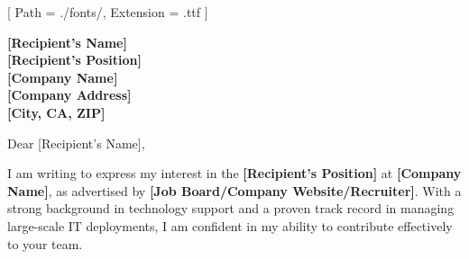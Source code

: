 

\newcommand{\RecipientName}{[Recipient's Name]}
\newcommand{\RecipientPosition}{[Recipient's Position]}
\newcommand{\CompanyName}{[Company Name]}
\newcommand{\CompanyAddress}{[Company Address]}
\newcommand{\CompanyCityStateZIP}{[City, CA, ZIP]}
\newcommand{\JobSource}{[Job Board/Company Website/Recruiter]}
\newcommand{\SpecificReason}{[Specific reason related to the company or position]}

\ifincludephoto
\else
  \renewcommand{\photo}[2]{}
\fi

\ifmonochrome
  \renewcommand{\marginpar}[1]{}
\fi

\geometry{
  left=2cm,
  right=2cm,
  top=2cm,
  bottom=2cm,
  portrait
}

\setmainfont{NotoSans-Regular}[
  Path = ./fonts/,
  Extension = .ttf
]




\makecvheader

\vspace{1cm}

\textbf{\RecipientName} \\
\textbf{\RecipientPosition} \\
\textbf{\CompanyName} \\
\textbf{\CompanyAddress} \\
\textbf{\CompanyCityStateZIP}

\vspace{0.5cm}

\noindent Dear \RecipientName,

\vspace{0.5cm}

\justifying

I am writing to express my interest in the \textbf{\RecipientPosition} at \textbf{\CompanyName}, as advertised by \textbf{\JobSource}. With a strong background in technology support and a proven track record in managing large-scale IT deployments, I am confident in my ability to contribute effectively to your team.

